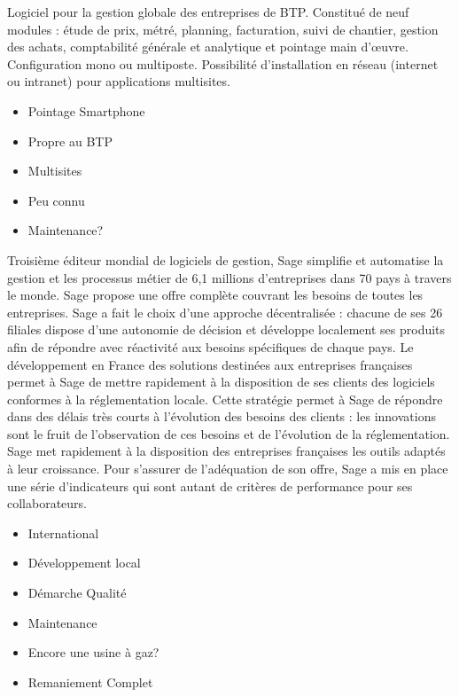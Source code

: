 {
Logiciel pour la gestion globale des entreprises de BTP. Constitué de neuf modules : étude de prix, métré, planning, facturation, suivi de chantier, gestion des achats, comptabilité générale et analytique et pointage main d'\oe uvre.
Configuration mono ou multiposte. Possibilité d'installation en réseau (internet ou intranet) pour applications multisites.
}
{
    \begin{itemize}
      \item Pointage Smartphone
      \item Propre au BTP
      \item Multisites
    \end{itemize}
}
{
    \begin{itemize}
        \item Peu connu
        \item Maintenance?
    \end{itemize}
}

{
  Troisième éditeur mondial de logiciels de gestion, Sage simplifie et automatise la gestion et les processus métier de 6,1 millions d'entreprises dans 70 pays à travers le monde.
  Sage propose une offre complète couvrant les besoins de toutes les entreprises.
  Sage a fait le choix d'une approche décentralisée : chacune de ses 26 filiales dispose d'une autonomie
   de décision et développe localement ses produits afin de répondre avec réactivité aux besoins spécifiques de chaque pays.
   Le développement en France des solutions destinées aux entreprises françaises permet  à  Sage de mettre rapidement à la disposition de ses clients des logiciels conformes à la réglementation locale.
  Cette stratégie permet à Sage de répondre dans des délais très courts  à  l'évolution des besoins des clients : les innovations sont le fruit de l'observation de ces besoins et de l'évolution de la réglementation.
  Sage met rapidement à la disposition des entreprises françaises les outils adaptés à leur croissance.
  Pour s'assurer de l'adéquation de son offre, Sage a mis en place une série d'indicateurs qui sont autant de critères de performance pour ses collaborateurs.
}
{
    \begin{itemize}
        \item International
        \item Développement local
        \item Démarche Qualité
        \item Maintenance
    \end{itemize}
}
{
    \begin{itemize}
        \item Encore une usine à gaz?
        \item Remaniement Complet
    \end{itemize}
}
 
